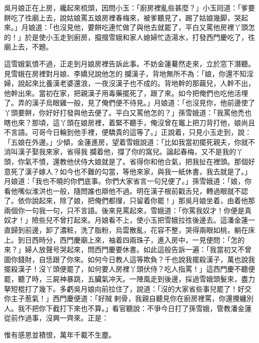 吳月娘正在上房，纔起來梳頭，因問小玉：「廚房裡亂些甚麼？」小玉囘道：「爹要餅吃了徃廟上去，說姑娘罵五娘房裡春梅來，被爹聽見了，踢了姑娘幾脚，哭起來。」月娘道：「也沒見他，要餅吃連忙做了與他去就罷了，平白又罵他房裡丫頭怎的！」於是使小玉走到廚房，攛掇雪娥和家人媳婦忙造湯水，打發西門慶吃了，徃廟上去，不題。

這雪娥氣憤不過，正走到月娘房裡告訴此事。不妨金蓮驀然走來，立於窓下潛聽。見雪娥在房裡對月娘、李嬌兒說他怎的𢺞攔漢子，背地無所不為：「娘，你還不知淫婦，說起來比養漢老婆還浪，一夜沒漢子也不成的。背地幹的那繭兒，人幹不出，他幹出來。{}當初在家，把親漢子用毒藥擺死了，跟了來。如今把俺們也吃他活埋了。弄的漢子烏眼雞一般，見了俺們便不待見。」月娘道：「也沒見你，他前邊使了丫頭要餅，你好好打發與他去便了。平白又罵他怎的？」孫雪娥道：「我罵他禿也瞎也來？那頃，這丫頭在娘房裡，着緊不聽手，俺沒曾在竈上把刀背打他，{}娘尚且不言語。可哥今日輪到他手裡，便驕貴的這等了。」正說着，只見小玉走到，說：「五娘在外邊。」{}少傾，金蓮進房，望着雪娥說道：「比如我當初擺死親夫，你就不消叫漢子娶我來家，省得我𢺞攔着他，撐了你的窩兒。{}論起春梅，又不是我的丫頭，你氣不憤，還教他伏侍大娘就是了。省得你和他合氣，把我扯在裡頭。那個好意死了漢子嫁人？{}如今也不難的勾當，等他來家，與我一紙休書，我去就是了。」月娘道：「我也不曉的你們底事。你們大家省言一句兒便了。」孫雪娥道：「娘，你看他嘴似淮洪也一般，隨問誰也辯他不過。{}明在漢子根前戳舌兒，轉過眼就不認了。依你說起來，除了娘，把俺們都攆，只留着你罷！」那吳月娘坐着，由着他那兩個你一句我一句，只不言語。後來見罵起來，雪娥道：「你罵我奴才！你便是真奴才！」險些兒不曾打起來。月娘看不上，使小玉把雪娥拉徃後邊去。這潘金蓮一直歸到前邊，卸了濃粧，洗了脂粉，烏雲散亂，花容不整，哭得兩眼如桃，躺在床上。{}到日西時分，西門慶廟上來，袖着四兩珠子，進入房中，一見便問：「怎的來？」婦人放聲号哭起來，問西門慶要休書。如此這般告訴一遍：「我當初又不曾圖你錢財，自恁跟了你來。如何今日教人這等欺負？千也說我擺殺漢子，萬也說我擺殺漢子！沒丫頭便罷了，如何要人房裡丫頭伏侍？吃人指罵！」這西門慶不聽便罷，聽了時，三屍神暴跳，五臟氣冲天。一陣風走到後邊，採過雪娥頭髮來，盡力{}拏短棍打了幾下。多虧吳月娘向前拉住了，說道：「沒的大家省些事兒罷了！{}好交你主子惹氣！」西門慶便道：「好賊𢱉剌骨，我親自聽見你在廚房裡罵，你還攪纏別人。我不把你下截打下來也不算。」看官聽說：不爭今日打了孫雪娥，管教潘金蓮從前作過事，沒興一齊來。正是：

\begin{myquote}
惟有感恩並積恨，萬年千載不生塵。
\end{myquote}

